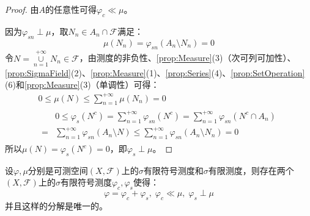 \begin{proof}
	由$A$的任意性可得$\varphi_c\ll\mu$。\par
	因为$\varphi_{sn}\perp\mu$，取$N_n\in A_n\cap\mathscr{F}$满足：
	\begin{equation*}
		\mu(N_n)=\varphi_{sn}(A_n\setminus N_n)=0
	\end{equation*}
	令$N=\underset{n=1}{\overset{+\infty}{\cup}}N_n\in\mathscr{F}$，由测度的非负性、\cref{prop:Measure}(3)（次可列可加性）、\cref{prop:SigmaField}(2)、\cref{prop:Measure}(1)、\cref{prop:Series}(4)、\cref{prop:SetOperation}(6)和\cref{prop:Measure}(3)（单调性）可得：
	\begin{gather*}
		0\leqslant\mu(N)\leqslant\sum_{n=1}^{+\infty}\mu(N_n)=0 \\
		\begin{aligned}
			&0\leqslant\varphi_s(N^c)=\sum_{n=1}^{+\infty}\varphi_{sn}(N^c)=\sum_{n=1}^{+\infty}\varphi_{sn}(N^c\cap A_n) \\
			=&\sum_{n=1}^{+\infty}\varphi_{sn}(A_n\setminus N)\leqslant\sum_{n=1}^{+\infty}\varphi_{sn}(A_n\setminus N_n)=0
		\end{aligned}
	\end{gather*}
	所以$\mu(N)=\varphi_s(N^c)=0$，即$\varphi_s\perp\mu$。
\end{proof}
\begin{lemma}\label{lem:LebesgueDecomposition3}
	设$\varphi,\mu$分别是可测空间$(X,\mathscr{F})$上的$\sigma$有限符号测度和$\sigma$有限测度，则存在两个$(X,\mathscr{F})$上的$\sigma$有限符号测度$\varphi_c,\varphi_s$使得：
	\begin{equation*}
		\varphi=\varphi_c+\varphi_s,\;\varphi_c\ll\mu,\;\varphi_s\perp\mu
	\end{equation*}
	并且这样的分解是唯一的。
\end{lemma}
